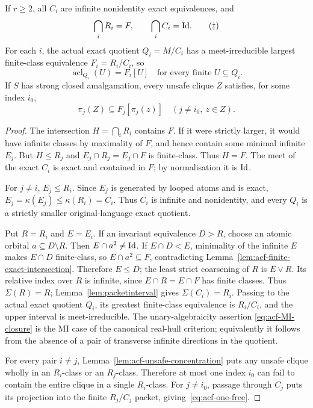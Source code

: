 \begin{lemma}
\label{lem:acf-canonical-coordinates}
If \(r\ge2\), all \(C_i\) are infinite nonidentity exact
equivalences, and
\[
        \bigcap_iR_i=F,\qquad
        \bigcap_iC_i=\mathrm{Id}.
        \tag{\(\ddagger\)}\label{eq:acf-core-meets}
\]
For each \(i\), the actual exact quotient \(Q_i=M/C_i\)
has a meet-irreducible largest finite-class equivalence
\(F_i=R_i/C_i\), so
\[
     \operatorname{acl}_{Q_i}(U)=F_i[U]
               \quad\text{for every finite }U\subseteq Q_i.
               \tag{\(\heartsuit\)}\label{eq:acf-MI-closure}
\]
If \(S\) has strong closed amalgamation, every unsafe clique
\(Z\) satisfies, for some index \(i_0\),
\[
   \pi_j(Z)\subseteq F_j[\pi_j(z)]
              \quad(j\ne i_0,\ z\in Z).
        \tag{\(\clubsuit\)}\label{eq:acf-one-free}
\]
\end{lemma}
\begin{proof}
The intersection \(H=\bigcap_iR_i\) contains \(F\).
If it were strictly larger, it would have infinite classes
by maximality of \(F\), and hence contain some minimal
infinite \(E_j\).  But \(H\le R_j\) and
\(E_j\cap R_j=E_j\cap F\) is finite-class.  Thus \(H=F\).
The meet of the exact \(C_i\) is exact and contained in
\(F\); by normalisation it is \(\mathrm{Id}\).

For \(j\ne i\), \(E_j\le R_i\).  Since \(E_j\) is generated
by looped atoms and is exact,
\(E_j=\kappa(E_j)\le\kappa(R_i)=C_i\).  Thus \(C_i\)
is infinite and nonidentity, and every \(Q_i\) is a
strictly smaller original-language exact quotient.

Put \(R=R_i\) and \(E=E_i\).  If an invariant equivalence
\(D>R\), choose an atomic orbital \(a\subseteq D\setminus R\).
Then \(E\cap a^2\ne\mathrm{Id}\).  If \(E\cap D<E\), minimality of
the infinite \(E\) makes \(E\cap D\) finite-class, so
\(E\cap a^2\subseteq F\), contradicting
Lemma~\ref{lem:acf-finite-exact-intersection}.  Therefore
\(E\le D\); the least strict coarsening of \(R\) is \(E\vee R\).
Its relative index over \(R\) is infinite, since
\(E\cap R=E\cap F\) has finite classes.  Thus
\(\Sigma(R)=R\); Lemma~\ref{lem:packetinterval}
gives \(\Sigma(C_i)=R_i\).  Passing to the actual
exact quotient \(Q_i\), its greatest finite-class
equivalence is \(R_i/C_i\), and the upper interval is
meet-irreducible.  The unary-algebraicity assertion
\eqref{eq:acf-MI-closure} is the MI case of the
canonical real-hull criterion; equivalently it follows
from the absence of a pair of transverse infinite
directions in the quotient.

For every pair \(i\ne j\), Lemma~\ref{lem:acf-unsafe-concentration}
puts any unsafe clique wholly in an \(R_i\)-class or an
\(R_j\)-class.  Therefore at most one index \(i_0\)
can fail to contain the entire clique in a single
\(R_i\)-class.  For \(j\ne i_0\), passage through \(C_j\)
puts its projection into the finite \(R_j/C_j\) packet,
giving~\eqref{eq:acf-one-free}.
\end{proof}

